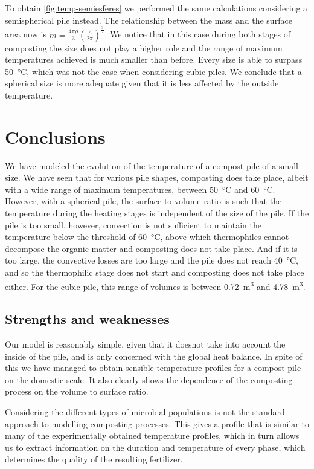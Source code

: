 \documentclass[12pt, a4paper, twocolumn, twoside]{article}
\numberwithin{table}{section}
\numberwithin{figure}{section}
\numberwithin{equation}{section}
\begin{document}
To obtain \cref{fig:temp-semiesferes} we performed the same calculations considering a semispherical pile instead. The relationship between the mass and the surface area now is \( m = \frac{4\pi\rho}{3}\left(\frac{A}{2\pi}\right)^{\frac{3}{2}} \). We notice that in this case during both stages of composting the size does not play a higher role and the range of maximum temperatures achieved is much smaller than before. Every size is able to surpass \SI{50}{\celsius}, which was not the case when considering cubic piles. We conclude that a spherical size is more adequate given that it is less affected by the outside temperature. 

\section{Conclusions}
We have modeled the evolution of the temperature of a compost pile of a small size. We have seen that for various pile shapes, composting does take place, albeit with a wide range of maximum temperatures, between \SI{50}{\celsius} and \SI{60}{\celsius}. However, with a spherical pile, the surface to volume ratio is such that the temperature during the heating stages is independent of the size of the pile. If the pile is too small, however, convection is not sufficient to maintain the temperature below the threshold of \SI{60}{\celsius}, above which thermophiles cannot decompose the organic matter and composting does not take place. And if it is too large, the convective losses are too large and the pile does not reach \SI{40}{\celsius}, and so the thermophilic stage does not start and composting does not take place either. For the cubic pile, this range of volumes is between \SI{0.72}{m^3} and \SI{4.78}{m^3}.   

\subsection{Strengths and weaknesses}
Our model is reasonably simple, given that it doesnot take into account the inside of the pile, and is only concerned with the global heat balance. In spite of this we have managed to obtain sensible temperature profiles for a compost pile on the domestic scale. It also clearly shows the dependence of the composting process on the volume to surface ratio.

Considering the different types of microbial populations is not the standard approach to modelling composting processes. This gives a profile that is similar to many of the experimentally obtained temperature profiles, which in turn allows us to extract information on the duration and temperature of every phase, which determines the quality of the resulting fertilizer. 
\end{document}
